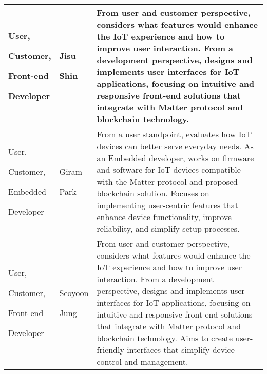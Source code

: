 \documentclass[conference]{IEEEtran}
\begin{document}
\begin{table}
	\def\arraystretch{1.24} \small
	\begin{tabular}{|p{1.8cm}|p{1.4cm}|p{4.4cm}|}
		\hline
						        
		User, \par Customer, \par Front-end \par Developer & Jisu \par Shin    & From user and customer perspective, considers what features would enhance the IoT experience and how to improve user interaction. From a development perspective, designs and implements user interfaces for IoT applications, focusing on intuitive and responsive front-end solutions that integrate with Matter protocol and blockchain technology.                                                                                      \\ \hline
						        
		User, \par Customer, \par Embedded \par Developer  & Giram \par Park   & From a user standpoint, evaluates how IoT devices can better serve everyday needs. As an Embedded developer, works on firmware and software for IoT devices compatible with the Matter protocol and proposed blockchain solution. Focuses on implementing user-centric features that enhance device functionality, improve reliability, and simplify setup processes.                                                                       \\ \hline
						        
		User, \par Customer, \par Front-end \par Developer & Seoyoon \par Jung & From user and customer perspective, considers what features would enhance the IoT experience and how to improve user interaction. From a development perspective, designs and implements user interfaces for IoT applications, focusing on intuitive and responsive front-end solutions that integrate with Matter protocol and blockchain technology. Aims to create user-friendly interfaces that simplify device control and management. \\ \hline
	\end{tabular}
\end{table}
\end{document}
